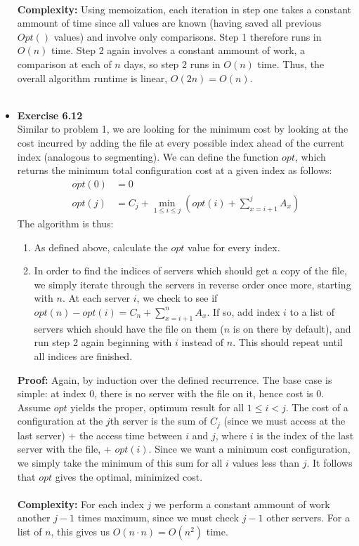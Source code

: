 \documentclass[a4paper]{article}
\begin{document}
\begin{itemize}
\\
\textbf{Complexity:}
Using memoization, each iteration in step one takes a constant ammount of time since all values are known (having saved all previous $Opt()$ values) and involve only comparisons. Step 1 therefore runs in $O(n)$ time. Step 2 again involves a constant ammount of work, a comparison at each of $n$ days, so step 2 runs in $O(n)$ time. Thus, the overall algorithm runtime is linear, $O(2n) = O(n)$. \\
\\


\item{\textbf{Exercise 6.12}} \\
Similar to problem 1, we are looking for the minimum cost by looking at the cost incurred by adding the file at every possible index ahead of the current index (analogous to segmenting). We can define the function $opt$, which returns the minimum total configuration cost at a given index as follows:
\begin{align*}
opt(0) &= 0 \\
opt(j) &= C_j + \min_{1 \leq i \leq j}\left(opt(i) + \sum_{x = i+1}^j A_x\right)
\end{align*}
The algorithm is thus:
\begin{enumerate}
\item As defined above, calculate the $opt$ value for every index.
\item In order to find the indices of servers which should get a copy of the file, we simply iterate through the servers in reverse order once more, starting with $n$. At each server $i$, we check to see if $opt(n) - opt(i) = C_n + \sum_{x = i+1}^n A_x$. If so, add index $i$ to a list of servers which should have the file on them ($n$ is on there by default), and run step 2 again beginning with $i$ instead of $n$. This should repeat until all indices are finished.
\end{enumerate}
\textbf{Proof:} Again, by induction over the defined recurrence. The base case is simple: at index 0, there is no server with the file on it, hence cost is 0. Assume $opt$ yields the proper, optimum result for all $1 \leq i < j$. The cost of a configuration at the $j$th server is the sum of $C_j$ (since we must access at the last server) + the access time between $i$ and $j$, where $i$ is the index of the last server with the file, + $opt(i)$. Since we want a minimum cost configuration, we simply take the minimum of this sum for all $i$ values less than $j$. It follows that $opt$ gives the optimal, minimized cost. \\
\\
\textbf{Complexity:} For each index $j$ we perform a constant ammount of work another $j-1$ times maximum, since we must check $j-1$ other servers. For a list of $n$, this gives us $O(n \cdot n) = O(n^2)$ time. \\
\\



\end{itemize}
\end{document}
